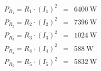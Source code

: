 \documentclass[10pt]{article}
\begin{document}
\vspace{-6mm}
\begin{eqnarray*}
P_{R_1} = R_1 \cdot (I_1)^2 & = & \qty{6400}{\watt}\\
P_{R_2} = R_2 \cdot (I_2)^2 & = & \qty{7396}{\watt}\\
P_{R_3} = R_3 \cdot (I_3)^2 & = & \qty{1024}{\watt}\\
P_{R_4} = R_4 \cdot (I_4)^2 & = & \qty{588}{\watt}\\
P_{R_5} = R_5 \cdot (I_5)^2 & = & \qty{5832}{\watt}
\end{eqnarray*}
\end{document}
